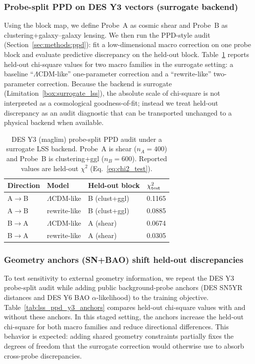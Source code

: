 \documentclass[11pt]{article}
\theoremstyle{definition}
\theoremstyle{plain}
\theoremstyle{remark}
\begin{document}
\subsubsection{Probe-split PPD on DES Y3 vectors (surrogate backend)}\label{sec:results:lss_ppd}
Using the block map, we define Probe~A as cosmic shear and Probe~B as clustering+galaxy--galaxy lensing.
We then run the PPD-style audit (Section~\ref{sec:methods:ppd}): fit a low-dimensional macro correction on one probe block and evaluate predictive discrepancy on the held-out block.
Table~\ref{tab:lss_ppd_y3} reports held-out chi-square values for two macro families in the surrogate setting: a baseline ``$\Lambda$CDM-like'' one-parameter correction and a ``rewrite-like'' two-parameter correction.
Because the backend is surrogate (Limitation~\ref{box:surrogate_lss}), the absolute scale of chi-square is not interpreted as a cosmological goodness-of-fit; instead we treat held-out discrepancy as an audit diagnostic that can be transported unchanged to a physical backend when available.

\begin{table}[t]
\centering
\caption{DES Y3 (maglim) probe-split PPD audit under a surrogate LSS backend. Probe~A is shear ($n_A=400$) and Probe~B is clustering+ggl ($n_B=600$). Reported values are held-out $\chi^2$ (Eq.~\eqref{eq:chi2_test}).}
\label{tab:lss_ppd_y3}
\begin{tabular}{@{}llll@{}}
\toprule
Direction & Model & Held-out block & $\chi^2_{\rm test}$ \\
\midrule
A$\to$B & $\Lambda$CDM-like & B (clust+ggl) & 0.1165 \\
A$\to$B & rewrite-like & B (clust+ggl) & 0.0885 \\
B$\to$A & $\Lambda$CDM-like & A (shear) & 0.0674 \\
B$\to$A & rewrite-like & A (shear) & 0.0305 \\
\bottomrule
\end{tabular}
\end{table}

\subsubsection{Geometry anchors (SN+BAO) shift held-out discrepancies}\label{sec:results:lss_anchors}
To test sensitivity to external geometry information, we repeat the DES Y3 probe-split audit while adding public background-probe anchors (DES SN5YR distances and DES Y6 BAO $\alpha$-likelihood) to the training objective.
Table~\ref{tab:lss_ppd_y3_anchors} compares held-out chi-square values with and without these anchors.
In this staged setting, the anchors increase the held-out chi-square for both macro families and reduce directional differences.
This behavior is expected: adding shared geometry constraints partially fixes the degrees of freedom that the surrogate correction would otherwise use to absorb cross-probe discrepancies.
\end{document}
